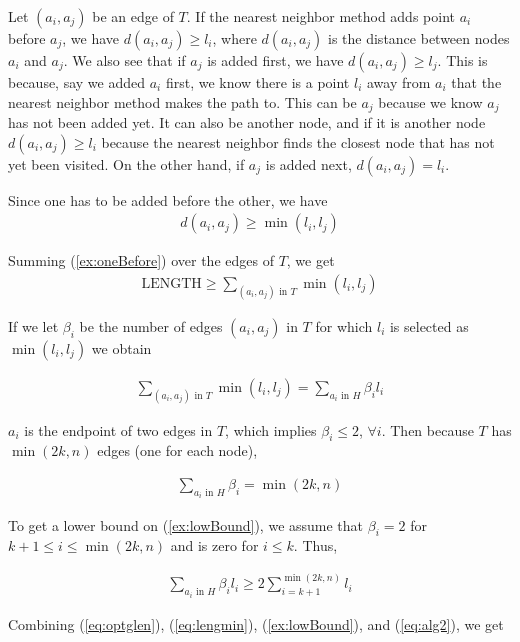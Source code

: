 Let $(a_i,a_j)$ be an edge of $T$. If the nearest neighbor method adds point $a_i$ before $a_j$, we have $d(a_i,a_j) \geq l_i$, where $d(a_i,a_j)$ is the distance between nodes $a_i$ and $a_j$. We also see that if $a_j$ is added first, we have $d(a_i, a_j) \geq l_j$. This is because, say we added $a_i$ first, we know there is a point $l_i$ away from $a_i$ that the nearest neighbor method makes the path to. This can be $a_j$ because we know $a_j$ has not been added yet. It can also be another node, and if it is another node $d(a_i, a_j) \geq l_i$ because the nearest neighbor finds the closest node that has not yet been visited. On the other hand, if $a_j$ is added next, $d(a_i, a_j) = l_i$. 

Since one has to be added before the other, we have 
\begin{align}
d(a_i , a_j) \geq \min(l_i, l_j) \label{ex:oneBefore}
\end{align}

Summing (\ref{ex:oneBefore}) over the edges of $T$, we get
\begin{align}
\text{LENGTH} \geq \sum_{(a_i,a_j) \text{ in } T} \min(l_i,l_j)  \label{eq:lengmin}
\end{align}

If we let $\beta_i$ be the number of edges $(a_i, a_j)$ in $T$ for which $l_i$ is selected as $\min(l_i, l_j)$ we obtain 

\begin{align}
\sum_{(a_i,a_j) \text{ in } T} \min(l_i, l_j) = \sum_{a_i \text{ in } H} \beta_i l_i  \label{ex:lowBound}
\end{align}

$a_i$ is the endpoint of two edges in $T$, which implies $\beta_i \leq 2$, $\forall i$. Then because $T$ has $\min(2k,n)$ edges (one for each node),

\begin{align}
\sum_{a_i \text{ in } H} \beta_i = \min(2k,n) 
\end{align}

To get a lower bound on (\ref{ex:lowBound}), we assume that $\beta_i = 2 $ for $k+1 \leq i \leq \min(2k,n)$ and is zero for $i \leq k$. Thus,

\begin{align}
\sum_{a_i \text{ in } H} \beta_i l_i \geq 2 \sum_{i=k+1}^{\min(2k,n)} l_i \label{eq:alg2}
\end{align}

Combining (\ref{eq:optglen}), (\ref{eq:lengmin}), (\ref{ex:lowBound}), and (\ref{eq:alg2}), we get

